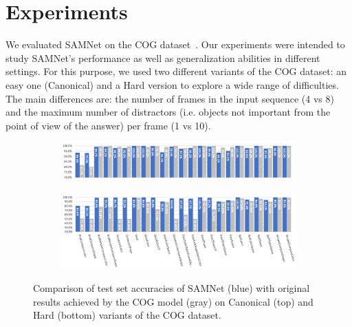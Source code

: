 \section{Experiments}

We evaluated SAMNet on the COG dataset~\cite{yang2018dataset}.
Our experiments were intended to study SAMNet's performance as well as generalization abilities in different settings.
For this purpose, we used two different variants of the COG dataset: an easy one (Canonical) and a Hard version to explore a wide range of difficulties.
The main differences are: the number of frames in the input sequence (4 vs 8) and the maximum number of distractors (i.e. objects not important from the point of view of the answer) per frame (1 vs 10).


%
%


\begin{figure}[htbp]
	\centering
  \begin{subfigure}{\textwidth}
    \includegraphics[width=0.99\textwidth]{results/samnet_cog_orig_canonical_no_labels.png}
  \end{subfigure}%
  \newline
  \begin{subfigure}{\textwidth}
	\includegraphics[width=\textwidth]{results/samnet_cog_orig_hard.png}
  \end{subfigure}%
\caption{Comparison of test set accuracies of SAMNet (blue) with original results achieved by the COG model (gray) on Canonical (top) and Hard (bottom) variants of the COG dataset.}
\label{fig:samnet_cog_detailed}
\end{figure}

